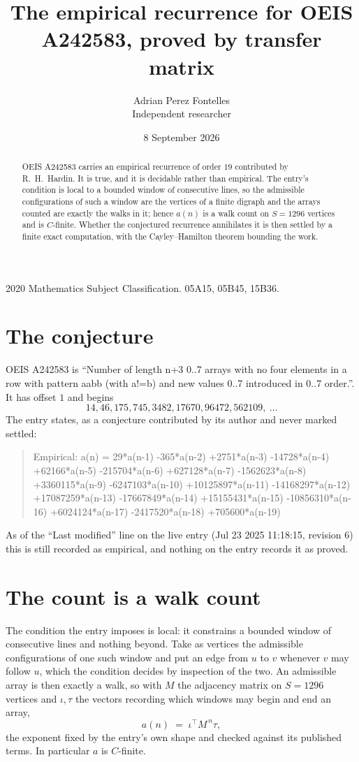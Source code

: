\documentclass[11pt,a4paper]{article}
\title{The empirical recurrence for OEIS A242583, proved by transfer matrix}
\author{Adrian Perez Fontelles\\ \small Independent researcher}
\date{8 September 2026}
\theoremstyle{plain}
\theoremstyle{definition}
\begin{document}
\maketitle

\begin{abstract}
OEIS A242583 carries an empirical recurrence of order $19$ contributed by R.~H.~Hardin. It is
true, and it is decidable rather than empirical. The entry's condition is local to a bounded window of consecutive lines, so
the admissible configurations of such a window are the vertices of a finite digraph and the
arrays counted are exactly the walks in it; hence $a(n)$ is a walk count on $S=1296$ vertices
and is $C$-finite. Whether the conjectured recurrence annihilates it is then settled by a
finite exact computation, with the Cayley--Hamilton theorem bounding the work.
\end{abstract}

\noindent\small 2020 Mathematics Subject Classification. 05A15, 05B45, 15B36.\normalsize

\section{The conjecture}

OEIS A242583 is ``Number of length n+3 0..7 arrays with no four elements in a row with pattern aabb (with a!=b) and new values 0..7 introduced in 0..7 order.''. It has offset $1$ and begins
\[
14, 46, 175, 745, 3482, 17670, 96472, 562109,\ \dots
\]
The entry states, as a conjecture contributed by its author and never marked settled:
\begin{quote}
Empirical: a(n) = 29*a(n-1) -365*a(n-2) +2751*a(n-3) -14728*a(n-4) +62166*a(n-5) -215704*a(n-6) +627128*a(n-7) -1562623*a(n-8) +3360115*a(n-9) -6247103*a(n-10) +10125897*a(n-11) -14168297*a(n-12) +17087259*a(n-13) -17667849*a(n-14) +15155431*a(n-15) -10856310*a(n-16) +6024124*a(n-17) -2417520*a(n-18) +705600*a(n-19)
\end{quote}
As of the ``Last modified'' line on the live entry (Jul 23 2025 11:18:15, revision 6) this is still
recorded as empirical, and nothing on the entry records it as proved.

\section{The count is a walk count}

The condition the entry imposes is local: it constrains a bounded window of consecutive lines and nothing beyond. Take as
vertices the admissible configurations of one such window and put an edge from $u$ to $v$
whenever $v$ may follow $u$, which the condition decides by inspection of the two. An
admissible array is then exactly a walk, so with $M$ the adjacency matrix on $S=1296$ vertices
and $\iota,\tau$ the vectors recording which windows may begin and end an array,
\[
a(n)\;=\;\iota^{\!\top}M^{\,n}\tau ,
\]
the exponent fixed by the entry's own shape and checked against its published terms. In
particular $a$ is $C$-finite.
\end{document}
